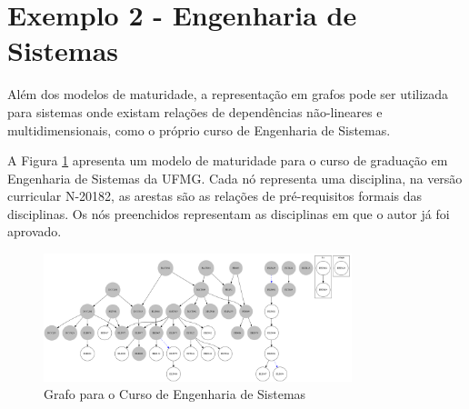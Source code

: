 \documentclass[10pt,a4paper]{article}
\begin{document}
	\section{Exemplo 2 - Engenharia de Sistemas}
	
	Além dos modelos de maturidade, a representação em grafos pode ser utilizada para sistemas onde existam relações de dependências não-lineares e multidimensionais, como o próprio curso de Engenharia de Sistemas.
	
	A Figura \ref{fig:grafo_engsis} apresenta um modelo de maturidade para o curso de graduação em Engenharia de Sistemas da UFMG. Cada nó representa uma disciplina, na versão curricular N-20182, as arestas são as relações de pré-requisitos formais das disciplinas. Os nós preenchidos representam as disciplinas em que o autor já foi aprovado.
	
	\begin{figure}
	    \centering
	    \includegraphics[width=0.8\textwidth]{grafo_engsis.png}
	    \caption{Grafo para o Curso de Engenharia de Sistemas}
	    \label{fig:grafo_engsis}
	\end{figure}
\end{document}
